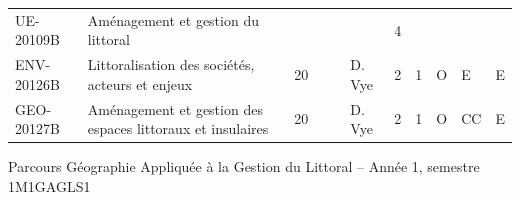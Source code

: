 \documentclass[a4paper,11pt]{article}
\begin{document}
{{\begin{tabular}{lllllllllll}
\rowcolor[HTML]{EFEFEF} 
UE-20109B                          & Aménagement et gestion du littoral                                             &    &    &    &                                   & 4    &      &             &                &           \\
ENV-20126B                         & Littoralisation des sociétés, acteurs et enjeux                                & 20 &    &    & D. Vye                            & 2    & 1    & O           & E              & E         \\
GEO-20127B                         & Aménagement et gestion des espaces littoraux et insulaires                     & 20 &    &    & D. Vye                            & 2    & 1    & O           & CC             & E        
\end{tabular}}
}{Parcours Géographie Appliquée à la Gestion du Littoral -- Année 1, semestre 1}{M1GAGLS1}
\end{document}
